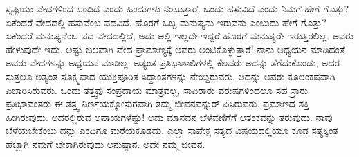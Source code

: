 ಸೃಷ್ಟಿಯು ವೇದಗಳಿಂದ ಬಂದಿದೆ ಎಂದು ಹಿಂದುಗಳು ನಂಬುತ್ತಾರೆ. ಒಂದು ಹಸುವಿದೆ ಎಂದು ನಿಮಗೆ ಹೇಗೆ ಗೊತ್ತು? ಏಕೆಂದರೆ ವೇದದಲ್ಲಿ ಹಸುವೆಂಬ ಪದವಿದೆ. ಹೊರಗೆ ಒಬ್ಬ ಮನುಷ್ಯನು ಇರುವನು ಎಂಬುದು ಹೇಗೆ ಗೊತ್ತು? ಏಕೆಂದರೆ ಮನುಷ್ಯನೆಂಬ ಪದ ವೇದದಲ್ಲಿದೆ, ಅದು ಅಲ್ಲಿ ಇಲ್ಲದೇ ಇದ್ದರೆ ಹೊರಗೆ ಮನುಷ್ಯರೇ ಇರುತ್ತಿರಲಿಲ್ಲ. ಅವರು ಹೇಳುವುದೇ ಇದು. ಅಷ್ಟು ಬಲವಾಗಿ ವೇದ ಪ್ರಾಮಾಣ್ಯಕ್ಕೆ ಅವರು ಅಂಟಿಕೊಳ್ಳುತ್ತಾರೆ! ನಾನು ಅಧ್ಯಯನ ಮಾಡಿದಂತೆ ಅವರು ವೇದಗಳನ್ನು ಅಧ್ಯಯನ ಮಾಡಿಲ್ಲ. ಅತ್ಯಂತ ಪ್ರತಿಭಾಶಾಲಿಗಳಲ್ಲಿ ಕೆಲವರು ಅದನ್ನು ತೆಗೆದುಕೊಂಡು, ಅದರ ಸುತ್ತಲೂ ಅತ್ಯಂತ ಸೂಕ್ಷ್ಮವಾದ ಯುಕ್ತಿಪೂರಿತ ಸಿದ್ಧಾಂತಗಳನ್ನು ನೇಯ್ದಿರುವರು. ಅದನ್ನು ಅವರು ಕೂಲಂಕಷವಾಗಿ ವಿಚಾರಿಸಿರುವರು. ಒಂದು ತತ್ತ್ವವು ಸಂಪ್ರದಾಯ ಮಾತ್ರವಲ್ಲ, ಸಾವಿರಾರು ವರುಷಗಳಿಂದಲೂ ಸಹ ಸ್ರಾರು ಪ್ರತಿಭಾವಂತರು ಈ ತತ್ತ್ವ ನಿರ್ಣಯಕ್ಕೋಸುಗವಾಗಿ ತಮ್ಮ ಜೀವನವನ್ನುರ್ ಪಿಸಿರುವರು. ಪ್ರಮಾಣದ ಶಕ್ತಿ ಹೀಗಿರುವುದು. ಅದರಲ್ಲಿರುವ ಅಪಾಯಗಳೆಷ್ಟು! ಅದು ಮಾನವನ ಬೆಳೆವಣಿಗೆಗೆ ಆತಂಕವನ್ನು ತರುವುದು. ನಾವು ಬೆಳೆಯಬೇಕೆಂಬು ದನ್ನು ಎಂದಿಗೂ ಮರೆಯಕೂಡದು. ಎಲ್ಲಾ ಸಾಪೇಕ್ಷ ಸತ್ಯದ ವಿಷಯದಲ್ಲಿಯೂ ಕೂಡ ಸತ್ಯಕ್ಕಿಂತ ಹೆಚ್ಚಾಗಿ ನಮಗೆ ಬೇಕಾಗಿರುವುದು ಅನುಷ್ಠಾನ. ಅದೇ ನಮ್ಮ ಜೀವನ. 

